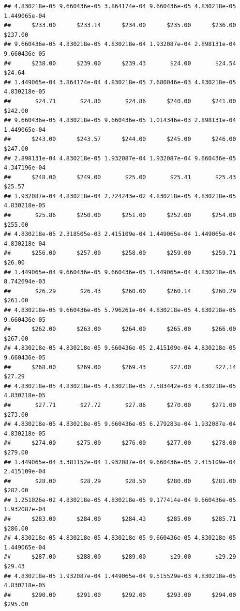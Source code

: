 \begin{verbatim}
## 4.830218e-05 9.660436e-05 3.864174e-04 9.660436e-05 4.830218e-05 1.449065e-04 
##      $233.00      $233.14      $234.00      $235.00      $236.00      $237.00 
## 9.660436e-05 4.830218e-05 4.830218e-04 1.932087e-04 2.898131e-04 9.660436e-05 
##      $238.00      $239.00      $239.43       $24.00       $24.54       $24.64 
## 1.449065e-04 3.864174e-04 4.830218e-05 7.680046e-03 4.830218e-05 4.830218e-05 
##       $24.71       $24.80       $24.86      $240.00      $241.00      $242.00 
## 9.660436e-05 4.830218e-05 9.660436e-05 1.014346e-03 2.898131e-04 1.449065e-04 
##      $243.00      $243.57      $244.00      $245.00      $246.00      $247.00 
## 2.898131e-04 4.830218e-05 1.932087e-04 1.932087e-04 9.660436e-05 4.347196e-04 
##      $248.00      $249.00       $25.00       $25.41       $25.43       $25.57 
## 1.932087e-04 4.830218e-04 2.724243e-02 4.830218e-05 4.830218e-05 4.830218e-05 
##       $25.86      $250.00      $251.00      $252.00      $254.00      $255.00 
## 4.830218e-05 2.318505e-03 2.415109e-04 1.449065e-04 1.449065e-04 4.830218e-04 
##      $256.00      $257.00      $258.00      $259.00      $259.71       $26.00 
## 1.449065e-04 9.660436e-05 9.660436e-05 1.449065e-04 4.830218e-05 8.742694e-03 
##       $26.29       $26.43      $260.00      $260.14      $260.29      $261.00 
## 4.830218e-05 9.660436e-05 5.796261e-04 4.830218e-05 4.830218e-05 9.660436e-05 
##      $262.00      $263.00      $264.00      $265.00      $266.00      $267.00 
## 4.830218e-05 4.830218e-05 9.660436e-05 2.415109e-04 4.830218e-05 9.660436e-05 
##      $268.00      $269.00      $269.43       $27.00       $27.14       $27.29 
## 4.830218e-05 4.830218e-05 4.830218e-05 7.583442e-03 4.830218e-05 4.830218e-05 
##       $27.71       $27.72       $27.86      $270.00      $271.00      $273.00 
## 4.830218e-05 4.830218e-05 9.660436e-05 6.279283e-04 1.932087e-04 4.830218e-05 
##      $274.00      $275.00      $276.00      $277.00      $278.00      $279.00 
## 1.449065e-04 3.381152e-04 1.932087e-04 9.660436e-05 2.415109e-04 2.415109e-04 
##       $28.00       $28.29       $28.50      $280.00      $281.00      $282.00 
## 1.251026e-02 4.830218e-05 4.830218e-05 9.177414e-04 9.660436e-05 1.932087e-04 
##      $283.00      $284.00      $284.43      $285.00      $285.71      $286.00 
## 4.830218e-05 4.830218e-05 4.830218e-05 9.660436e-05 4.830218e-05 1.449065e-04 
##      $287.00      $288.00      $289.00       $29.00       $29.29       $29.43 
## 4.830218e-05 1.932087e-04 1.449065e-04 9.515529e-03 4.830218e-05 4.830218e-05 
##      $290.00      $291.00      $292.00      $293.00      $294.00      $295.00 

\end{verbatim}

